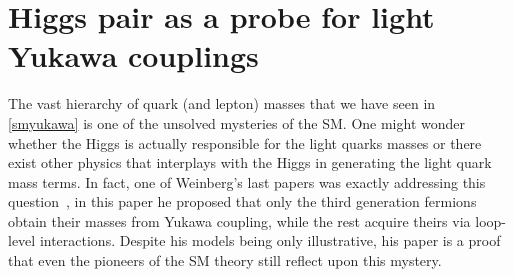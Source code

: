 
\chapter{ Higgs pair as a probe for light Yukawa couplings }\label{chap:lightyuk}
The vast hierarchy of quark  (and lepton) masses that we have seen in~ \autoref{smyukawa} is one of the unsolved mysteries of the SM.  One might wonder whether the Higgs  is actually responsible for the  light quarks masses or there exist other physics that interplays with the Higgs in generating the light quark mass terms. In fact, one of Weinberg's last papers was exactly addressing this question~\cite{Weinberg:2020zba}, in this paper he proposed that only the third generation fermions obtain their masses from Yukawa coupling, while the rest acquire theirs via loop-level interactions. Despite his models being only illustrative, his paper is a proof that even  the pioneers of the SM theory still reflect upon this mystery. \\
